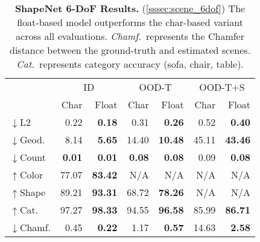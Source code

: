 \begin{table}[b]
\centering
\caption{
\textbf{ShapeNet 6-DoF Results.} (\cref{sssec:scene_6dof})
The float-based model outperforms the char-based variant across all evaluations.
\textit{Chamf.}~represents the Chamfer distance between the ground-truth and estimated scenes.
\textit{Cat.}~represents category accuracy (sofa, chair, table).
}
\begin{tabular}{lrr|rr|rr}
\toprule
& \multicolumn{2}{c}{ID} & \multicolumn{2}{c}{OOD-T} & \multicolumn{2}{c}{OOD-T+S} \\
& Char & Float & Char & Float & Char & Float \\
\midrule
$\downarrow$L2 & 0.22 & \textbf{0.18} & 0.31 & \textbf{0.26} & 0.52 & \textbf{0.40} \\
$\downarrow$Geod. & 8.14 & \textbf{5.65} & 14.40 & \textbf{10.48} & 45.11 & \textbf{43.46} \\
$\downarrow$Count & \textbf{0.01} & \textbf{0.01} & \textbf{0.08} & \textbf{0.08} & 0.09 & \textbf{0.08} \\
$\uparrow$Color & 77.07 & \textbf{83.42} & N/A & N/A & N/A & N/A \\
$\uparrow$Shape & 89.21 &\textbf{ 93.31} & 68.72 & \textbf{78.26} & N/A & N/A \\
$\uparrow$Cat.\ & 97.27 & \textbf{98.33} & 94.55 & \textbf{96.58} & 85.99 & \textbf{86.71} \\
$\downarrow$Chamf. & 0.45 & \textbf{0.22} & 1.17 & \textbf{0.57} & 14.63 & \textbf{2.58} \\
\bottomrule
\end{tabular}
\label{table:scene_6dof}
\end{table}
